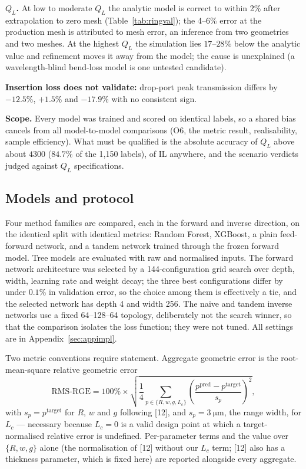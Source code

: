 \documentclass[11pt]{article}
\newcommand{\QL}{Q_L}
\newcommand{\rge}{\mathrm{RMS\text{-}RGE}}
\begin{document}
\textbf{$\QL$.} At low to moderate $\QL$ the analytic model is correct to within 2\% after extrapolation to zero mesh (Table~\ref{tab:ringval}); the 4--6\% error at the production mesh is attributed to mesh error, an inference from two geometries and two meshes. At the highest $\QL$ the simulation lies $17$--$28\%$ below the analytic value and refinement moves it away from the model; the cause is unexplained (a wavelength-blind bend-loss model is one untested candidate).

\textbf{Insertion loss does not validate:} drop-port peak transmission differs by $-12.5\%$, $+1.5\%$ and $-17.9\%$ with no consistent sign.

\textbf{Scope.} Every model was trained and scored on identical labels, so a shared bias cancels from all model-to-model comparisons (O6, the metric result, realisability, sample efficiency). What must be qualified is the absolute accuracy of $\QL$ above about $4300$ ($84.7\%$ of the 1{,}150 labels), of IL anywhere, and the scenario verdicts judged against $\QL$ specifications.


\subsection{Models and protocol}

Four method families are compared, each in the forward and inverse direction,
on the identical split with identical metrics: Random Forest, XGBoost, a plain
feed-forward network, and a tandem network trained through the frozen forward
model. Tree models are evaluated with raw and normalised inputs. The forward network architecture was selected by a 144-configuration grid search over depth, width, learning rate and weight decay; the three best configurations differ by under $0.1\%$ in validation error, so the choice among them is effectively a tie, and the selected network has depth 4 and width 256. The naive and tandem inverse networks use a fixed 64--128--64 topology, deliberately not the search winner, so that the comparison isolates the loss function; they were not tuned. All settings are in Appendix~\ref{sec:appimpl}.

Two metric conventions require statement. Aggregate geometric error is the
root-mean-square relative geometric error
\begin{equation}
\rge = 100\% \times
\sqrt{\frac{1}{4}\sum_{p \in \{R,w,g,L_c\}}
\left(\frac{p^{\mathrm{pred}} - p^{\mathrm{target}}}{s_p}\right)^2 },
\label{eq:rge}
\end{equation}
with $s_p = p^{\mathrm{target}}$ for $R$, $w$ and $g$ following [12], and
$s_p = \SI{3}{\micro\metre}$, the range width, for $L_c$ --- necessary because
$L_c = 0$ is a valid design point at which a target-normalised relative error
is undefined. Per-parameter terms and the value over $\{R,w,g\}$ alone (the normalisation of [12] without our $L_c$ term; [12] also has a thickness parameter, which is fixed here) are reported alongside every aggregate.
\end{document}
